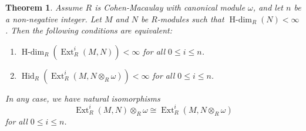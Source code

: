 \documentclass[11pt, a4paper,pagebackref]{amsart}
\numberwithin{equation}{section}
\newtheorem{theorem}{Theorem}[section]
\theoremstyle{definition}
\newtheorem{remark and definition}[theorem]{Remark and Definition}
\newtheorem{remark and notation}[theorem]{Remark and Notation}
\newcommand\Ext{\operatorname{Ext}}
\begin{document}
\begin{theorem}\label{sqmm}
    Assume $R$ is Cohen-Macaulay with canonical module $\omega$, and let $n$ be a non-negative integer. Let $M$ and $N$ be $R$-modules such that $\operatorname{H-dim}_R(N)<\infty$.  Then the following conditions are equivalent:
    \begin{enumerate}[\rm(1)]
        \item $\operatorname{H-dim}_R(\Ext_R^i(M,N))<\infty$ for all $0\leq i \leq n$.
        \item $\operatorname{Hid}_R(\Ext_R^i(M, N \otimes_R \omega))<\infty$ for all $0\leq i \leq n$.
    \end{enumerate}
   In any case, we have natural isomorphisms $$\Ext_R^i(M,N) \otimes_R \omega \cong \Ext_R^i(M, N \otimes_R \omega)$$
    for all $0\leq i \leq n$. 
\end{theorem}
\end{document}
